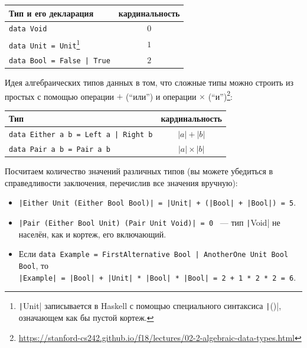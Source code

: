 \begin{center}
    \begin{tabular}{|l|c|}
        \hline
        Тип и его декларация                                                                                                                                                                            & кардинальность \\
        \hline
        \texttt{data Void}                                                                                                                                                                 & $0$            \\
        \texttt{data Unit = Unit}\footnote{\texttt|Unit| записывается в Haskell с помощью специального синтаксиса \texttt|()|, означающем как бы пустой кортеж.} & $1$ \\
        \texttt{data Bool = False | True}                                                                                                                                                  & $2$            \\
        \hline
    \end{tabular}
\end{center}

Идея алгебраических типов данных в том, что сложные типы можно строить из простых с помощью операции $+$ (``или'') и операции $\times$ (``и'')\footnote{\url{https://stanford-cs242.github.io/f18/lectures/02-2-algebraic-data-types.html}}:
\begin{center}
    \begin{tabular}{|l|c|}
        \hline
        Тип                                                      & кардинальность   \\
        \hline
        \texttt{data Either a b = Left a | Right b} & $|a| + |b|$      \\
        \texttt{data Pair a b = Pair a b}           & $|a| \times |b|$ \\
        \hline
    \end{tabular}
\end{center}

Посчитаем количество значений различных типов (вы можете убедиться в справедливости заключения, перечислив все значения вручную):
\begin{itemize}
    \item \texttt{|Either Unit (Either Bool Bool)| = |Unit| + (|Bool| + |Bool|) = 5}.
    \item \texttt{|Pair (Either Bool Unit) (Pair Unit Void)| = 0} ~--- тип \texttt|Void| не населён, как и кортеж, его включающий.
    \item Если \texttt{data Example = FirstAlternative Bool | AnotherOne Unit Bool Bool}, то \\\texttt{|Example| = |Bool| + |Unit| * |Bool| * |Bool| = 2 + 1 * 2 * 2 = 6}.
\end{itemize}

